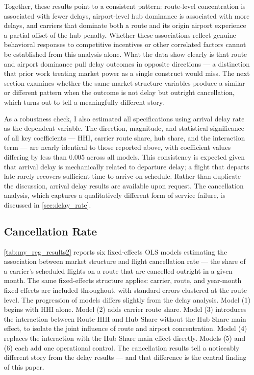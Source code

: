 \documentclass[preprint,12pt,authoryear]{elsarticle}
\begin{document}
Together, these results point to a consistent pattern: route-level concentration is associated with fewer delays, airport-level hub dominance is associated with more delays, and carriers that dominate both a route and its origin airport experience a partial offset of the hub penalty. Whether these associations reflect genuine behavioral responses to competitive incentives or other correlated factors cannot be established from this analysis alone. What the data show clearly is that route and airport dominance pull delay outcomes in opposite directions — a distinction that prior work treating market power as a single construct would miss. The next section examines whether the same market structure variables produce a similar or different pattern when the outcome is not delay but outright cancellation, which turns out to tell a meaningfully different story.

As a robustness check, I also estimated all specifications using arrival delay rate as the dependent variable. The direction, magnitude, and statistical significance of all key coefficients — HHI, carrier route share, hub share, and the interaction term — are nearly identical to those reported above, with coefficient values differing by less than 0.005 across all models. This consistency is expected given that arrival delay is mechanically related to departure delay; a flight that departs late rarely recovers sufficient time to arrive on schedule. Rather than duplicate the discussion, arrival delay results are available upon request. The cancellation analysis, which captures a qualitatively different form of service failure, is discussed in \autoref{sec:delay_rate}.

\newpage
\subsection{Cancellation Rate}

\autoref{tab:my_reg_results2} reports six fixed-effects OLS models estimating the association between market structure and flight cancellation rate — the share of a carrier's scheduled flights on a route that are cancelled outright in a given month. The same fixed-effects structure applies: carrier, route, and year-month fixed effects are included throughout, with standard errors clustered at the route level. The progression of models differs slightly from the delay analysis. Model (1) begins with HHI alone. Model (2) adds carrier route share. Model (3) introduces the interaction between Route HHI and Hub Share without the Hub Share main effect, to isolate the joint influence of route and airport concentration. Model (4) replaces the interaction with the Hub Share main effect directly. Models (5) and (6) each add one operational control. The cancellation results tell a noticeably different story from the delay results — and that difference is the central finding of this paper.
\end{document}

